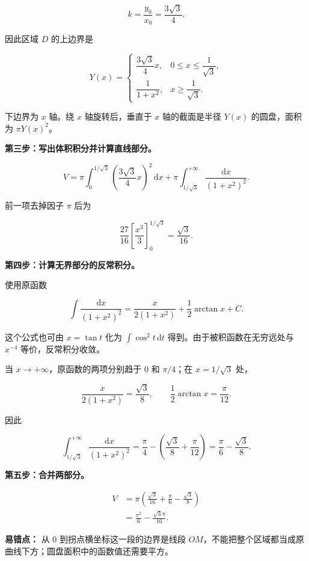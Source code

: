 \documentclass[UTF8,11pt,fontset=windows]{ctexart}
\begin{document}
$$
k=\frac{y_0}{x_0}=\frac{3\sqrt3}{4}.
$$

因此区域 $D$ 的上边界是

$$
Y(x)=\begin{cases}
\dfrac{3\sqrt3}{4}x,&0\le x\le\dfrac1{\sqrt3},\\[6pt]
\dfrac1{1+x^2},&x\ge\dfrac1{\sqrt3}.
\end{cases}
$$

下边界为 $x$ 轴。绕 $x$ 轴旋转后，垂直于 $x$ 轴的截面是半径 $Y(x)$ 的圆盘，面积为 $\pi Y(x)^2$。

\textbf{第三步：写出体积积分并计算直线部分。}

$$
V=\pi\int_0^{1/\sqrt3}\left(\frac{3\sqrt3}{4}x\right)^2\,\mathrm{d}x
+\pi\int_{1/\sqrt3}^{+\infty}\frac{\mathrm{d}x}{(1+x^2)^2}.
$$

前一项去掉因子 $\pi$ 后为

$$
\frac{27}{16}\left[\frac{x^3}{3}\right]_0^{1/\sqrt3}
=\frac{\sqrt3}{16}.
$$

\textbf{第四步：计算无界部分的反常积分。}

使用原函数

$$
\int\frac{\mathrm{d}x}{(1+x^2)^2}
=\frac{x}{2(1+x^2)}+\frac12\arctan x+C.
$$

这个公式也可由 $x=\tan t$ 化为 $\int\cos^2t\,\mathrm{d}t$ 得到。由于被积函数在无穷远处与 $x^{-4}$ 等价，反常积分收敛。

当 $x\to+\infty$，原函数的两项分别趋于 $0$ 和 $\pi/4$；在 $x=1/\sqrt3$ 处，

$$
\frac{x}{2(1+x^2)}=\frac{\sqrt3}{8},
\qquad
\frac12\arctan x=\frac\pi{12}.
$$

因此

$$
\int_{1/\sqrt3}^{+\infty}\frac{\mathrm{d}x}{(1+x^2)^2}
=\frac\pi4-\left(\frac{\sqrt3}{8}+\frac\pi{12}\right)
=\frac\pi6-\frac{\sqrt3}{8}.
$$

\textbf{第五步：合并两部分。}

$$
\begin{aligned}
V&=\pi\left(\frac{\sqrt3}{16}+\frac\pi6-\frac{\sqrt3}{8}\right)\\
&=\boxed{\frac{\pi^2}{6}-\frac{\sqrt3\pi}{16}}.
\end{aligned}
$$

\textbf{易错点：} 从 $0$ 到拐点横坐标这一段的边界是线段 $OM$，不能把整个区域都当成原曲线下方；圆盘面积中的函数值还需要平方。

\clearpage
\end{document}
